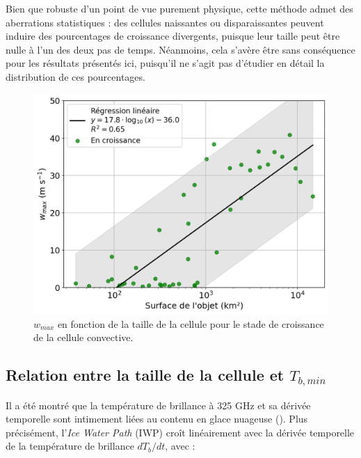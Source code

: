 \documentclass[12pt]{article}
\begin{document}
\begin{multicols}{2}
\vspace{-0.5cm}

Bien que robuste d'un point de vue purement physique, cette méthode admet des aberrations statistiques : des cellules naissantes ou disparaissantes peuvent induire des pourcentages de croissance divergents, puisque leur taille peut être nulle à l'un des deux pas de temps. Néanmoins, cela s'avère être sans conséquence pour les résultats présentés ici, puisqu'il ne s'agit pas d'étudier en détail la distribution de ces pourcentages.

\vspace{-0.5cm}
\begin{figure}[H]
    \centering
    \includegraphics[width=1\linewidth]{Figures/w_max_croissance.png}
    \vspace{-1em}
    \caption{$w_{max}$ en fonction de la taille de la cellule pour le stade de croissance de la cellule convective.}
    \label{fig:W_max_Croissante}
\end{figure}
\vspace{-5mm}
 
\subsection{Relation entre la taille de la cellule et \texorpdfstring{$T_{b, min}$}{TEXT}}

Il a été montré que la température de brillance à 325 GHz et sa dérivée temporelle sont intimement liées au contenu en glace nuageuse (\cite{Chaboureau}). Plus précisément, l'\textit{Ice Water Path} (IWP) croît linéairement avec la dérivée temporelle de la température de brillance $dT_b / dt$, avec :


\end{multicols}
\end{document}
